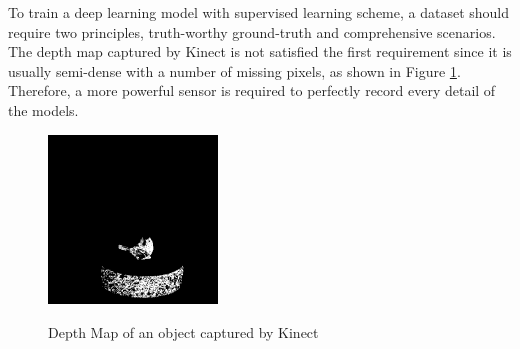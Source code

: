 To train a deep learning model with supervised learning scheme, a dataset should require two principles, truth-worthy ground-truth and comprehensive scenarios. The depth map captured by Kinect is not satisfied the first requirement since it is usually semi-dense with a number of missing pixels, as shown in Figure \ref{fig:depth-map-kinect}. Therefore, a more powerful sensor is required to  perfectly record every detail of the models.

\begin{figure}[!h]
	\centering
	{\includegraphics[width=0.4\textwidth]{./Figures/kinect-depth.png}}
	\label{fig:depth-map-kinect}
	\caption{Depth Map of an object captured by Kinect}
\end{figure}

